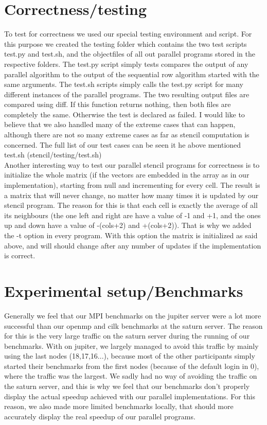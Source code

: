 \documentclass[11pt]{article}
\begin{document}
\section{Correctness/testing} To test for correctness we used our special testing environment and script. For this purpose we created the testing folder which contains
the two test scripts test.py and test.sh, and the objectfiles of all out parallel programs stored in the respective folders. The test.py script simply tests compares the output of
any parallel algorithm to the output of the sequential row algorithm started with the same arguments. The test.sh scripts simply calls the test.py script for many different instances of the
parallel programs. The two resulting output files are compared using diff. If this function returns nothing, then both files are completely the same. Otherwise the test is declared as failed. 
I would like to believe that we also handled many of the extreme cases that can happen, although there are not so many extreme cases as far as stencil computation is concerned. The full list of
our test cases can be seen it he above mentioned test.sh (stencil/testing/test.sh)\\
Another interesting way to test our parallel stencil programs for correctness is to initialize the whole matrix (if the vectors are embedded in the array as in our implementation), starting from null
and incrementing for every cell. The result is a matrix that will never change, no matter how many times it is updated by our stencil program. The reason for this is that each cell is exactly the average
of all its neighbours (the one left and right are have a value of -1 and +1, and the ones up and down have a value of -(cols+2) and +(cols+2)). That is why we added the -t option in every program. With this option the
matrix is initialized as said above, and will should change after any number of updates if the implementation is correct.

\section{Experimental setup/Benchmarks}
Generally we feel that our MPI benchmarks on the jupiter server were a lot more successful than our openmp and cilk benchmarks at the saturn server. The reason for this is the very large traffic on the saturn server during
the running of our benchmarks. With on jupiter, we largely managed to avoid this traffic by mainly using the last nodes (18,17,16...), because most of the other participants simply started their benchmarks from the first nodes (because of the default login in 0), where the
traffic was the largest. We sadly had no way of avoiding the traffic on the saturn server, and this is why we feel that our benchmarks don't properly display the actual speedup achieved with our parallel implementations. For this reason, we also made more limited benchmarks locally,
that should more accurately display the real speedup of our parallel programs.\\
\end{document}
